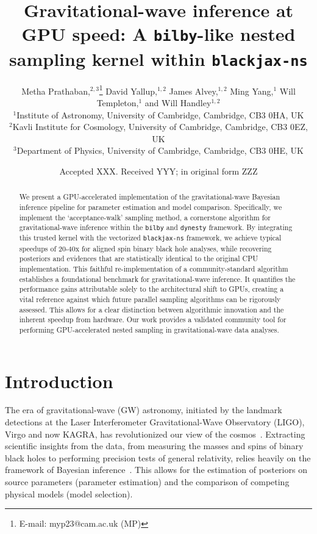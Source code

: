 \documentclass[fleqn,usenatbib]{mnras}
\title[GPU-accelerated nested sampling for gravitational waves]{Gravitational-wave inference at GPU speed: A \texttt{bilby}-like nested sampling kernel within \texttt{blackjax-ns}}
\author[Metha Prathaban et al.]{
Metha Prathaban,$^{2,3}$\thanks{E-mail: myp23@cam.ac.uk (MP)}
David Yallup,$^{1,2}$
James Alvey,$^{1,2}$
Ming Yang,$^{1}$
Will Templeton,$^{1}$
and Will Handley$^{1,2}$
\\
$^{1}$Institute of Astronomy, University of Cambridge, Cambridge, CB3 0HA, UK\\
$^{2}$Kavli Institute for Cosmology, University of Cambridge, Cambridge, CB3 0EZ, UK\\
$^{3}$Department of Physics, University of Cambridge, Cambridge, CB3 0HE, UK\\
}
\date{Accepted XXX. Received YYY; in original form ZZZ}
\begin{document}
\label{firstpage}
\pagerange{\pageref{firstpage}--\pageref{lastpage}}
\maketitle

\begin{abstract}
We present a GPU-accelerated implementation of the gravitational-wave
Bayesian inference pipeline for parameter estimation and model comparison. 
Specifically, we implement the `acceptance-walk'
sampling method, a cornerstone algorithm for gravitational-wave
inference within the \texttt{bilby} and \texttt{dynesty} framework.
By integrating this trusted kernel with the vectorized \texttt{blackjax-ns}
framework, we achieve typical speedups of 20-40x for aligned spin binary black hole
analyses, while recovering posteriors and evidences that are
statistically identical to the original CPU implementation. This faithful
re-implementation of a community-standard algorithm establishes a foundational
benchmark for gravitational-wave inference. It quantifies the
performance gains attributable solely to the architectural shift to GPUs,
creating a vital reference against which future parallel 
sampling algorithms can be rigorously assessed. 
This allows for a clear distinction between algorithmic innovation 
and the inherent speedup from hardware.
Our work provides a validated community tool for performing
GPU-accelerated nested sampling in gravitational-wave data analyses.
\vspace{0.5cm}
\end{abstract}





\section{Introduction}


The era of gravitational-wave (GW) astronomy, initiated by the landmark
detections at the Laser Interferometer Gravitational-Wave Observatory (LIGO),
Virgo and now KAGRA, has revolutionized
our view of the cosmos~\citep{GW150914, GW170817,GWTC1,GWTC2, GWTC3,GWTC3_pop_analysis,GWTC2_GR,siren}. 
Extracting scientific insights from the data, from measuring the
masses and spins of binary black holes to performing precision tests of general
relativity, relies heavily on the framework of Bayesian inference~\citep{Thrane_2019}. 
This allows for the estimation of posteriors on source parameters
(parameter estimation) and the comparison of competing physical models (model selection).
\end{document}
